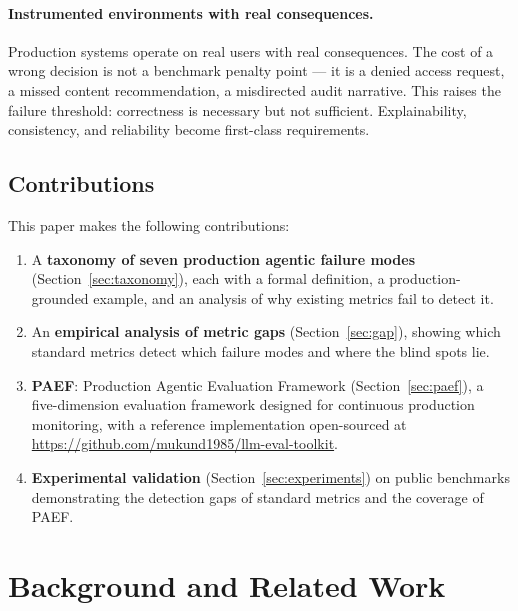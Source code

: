 \documentclass{article}
\begin{document}
\paragraph{Instrumented environments with real consequences.}
Production systems operate on real users with real consequences.  The cost of
a wrong decision is not a benchmark penalty point --- it is a denied access
request, a missed content recommendation, a misdirected audit narrative.  This
raises the failure threshold: correctness is necessary but not sufficient.
Explainability, consistency, and reliability become first-class requirements.

\subsection{Contributions}

This paper makes the following contributions:

\begin{enumerate}
  \item A \textbf{taxonomy of seven production agentic failure modes}
        (Section~\ref{sec:taxonomy}), each with a formal definition, a
        production-grounded example, and an analysis of why existing metrics
        fail to detect it.

  \item An \textbf{empirical analysis of metric gaps}
        (Section~\ref{sec:gap}), showing which standard metrics detect which
        failure modes and where the blind spots lie.

  \item \textbf{PAEF}: Production Agentic Evaluation Framework
        (Section~\ref{sec:paef}), a five-dimension evaluation framework
        designed for continuous production monitoring, with a reference
        implementation open-sourced at
        \url{https://github.com/mukund1985/llm-eval-toolkit}.

  \item \textbf{Experimental validation} (Section~\ref{sec:experiments})
        on public benchmarks demonstrating the detection gaps of standard
        metrics and the coverage of PAEF.
\end{enumerate}

\section{Background and Related Work}
\label{sec:related}
\end{document}
